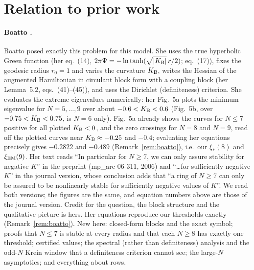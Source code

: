 \documentclass[11pt]{article}
\theoremstyle{definition}
\theoremstyle{remark}
\begin{document}
\section{Relation to prior work}\label{sec:prior}

\paragraph{Boatto \cite{Boatto2008}.} Boatto posed exactly this problem for this model. She uses the true hyperbolic Green function
(her eq.~(14), $2\pi\Psi=-\ln\tanh(\sqrt{|K_{\rm B}|}\,r/2)$; eq.~(17)), fixes the geodesic radius $r_0=1$ and varies the
curvature $K_{\rm B}$, writes the Hessian of the augmented Hamiltonian in circulant block form with a coupling block (her Lemma~5.2,
eqs.~(41)--(45)), and uses the Dirichlet (definiteness) criterion. She evaluates the extreme eigenvalues numerically: her Fig.~5a
plots the minimum eigenvalue for $N=5,\dots,9$ over about $-0.6<K_{\rm B}<0.6$ (Fig.~5b, over $-0.75<K_{\rm B}<0.75$, is $N=6$
only). Fig.~5a already shows the curves for $N\le7$ positive for all plotted $K_{\rm B}<0$, and the zero crossings for $N=8$ and
$N=9$, read off the plotted curves near $K_{\rm B}\approx-0.25$ and $-0.4$; evaluating her equations precisely gives $-0.2822$ and $-0.489$ (Remark~\ref{rem:boatto}), i.e.\ our $\xi_*(8)$ and $\xi_{\rm EM}(9)$. Her text reads ``In particular for $N\ge7$,
we can only assure stability for negative $K$'' in the preprint (mp\_arc 06-311, 2006) and ``\dots for sufficiently negative $K$'' in
the journal version, whose conclusion adds that ``a ring of $N\ge7$ can only be assured to be nonlinearly stable for sufficiently
negative values of $K$''. We read both versions; the figures are the same, and equation numbers above are those of the journal
version. Credit for the question, the block structure and the qualitative picture is hers. Her equations reproduce our thresholds exactly
(Remark~\ref{rem:boatto}). New here: closed-form blocks and the exact symbol; proofs that $N\le7$ is stable at every radius and that each
$N\ge8$ has exactly one threshold; certified values; the spectral (rather than definiteness) analysis and the odd-$N$ Krein window that
a definiteness criterion cannot see; the large-$N$ asymptotics; and everything about rows.
\end{document}
